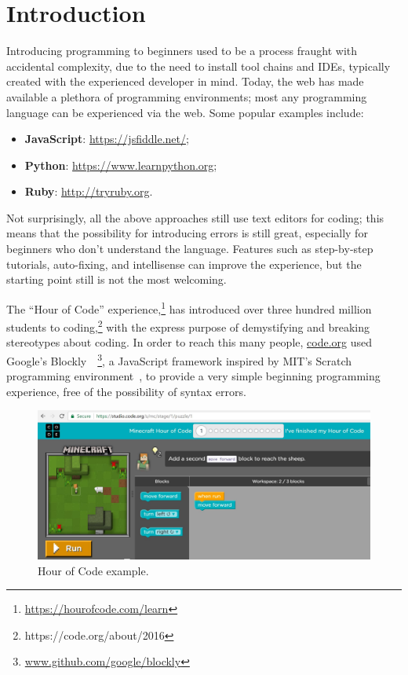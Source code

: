 \section{Introduction}


Introducing programming to beginners used to be a process fraught with
accidental complexity, due to the need to install tool chains and IDEs, 
typically created with the experienced developer in mind. Today, 
the web has made available a plethora of programming environments;
most any programming language can be experienced via the web. 
Some popular examples include:
\begin{itemize}
\item {\bf JavaScript}: \url{https://jsfiddle.net/};
\item {\bf Python}: \url{https://www.learnpython.org};
\item {\bf Ruby}: \url{http://tryruby.org}.
\end{itemize}
Not surprisingly, all the above approaches still use text editors for coding;
this means that the possibility for introducing errors is still great, especially 
for beginners who don't understand the language. Features such as step-by-step 
tutorials, auto-fixing, and intellisense can
improve the experience, but the starting point still is not the most welcoming. 


The ``Hour of Code'' experience,\footnote{\url{https://hourofcode.com/learn}} 
has introduced over three hundred million students to coding,\footnote{https://code.org/about/2016} 
with the express 
purpose of demystifying and breaking stereotypes about coding.
In order to reach this many people, \url{code.org} used
Google's Blockly~\cite{Blocky2015}~\footnote{\url{www.github.com/google/blockly}},
a JavaScript framework inspired by MIT's Scratch programming 
environment~\cite{ScratchCACM2009},
to provide a very simple beginning programming experience, 
free of the possibility of syntax errors. 

\begin{figure}[t]
    \includegraphics[width=\columnwidth]{pics/hourofcode}
\caption{\label{fig:hoc}Hour of Code example.}
\end{figure}

